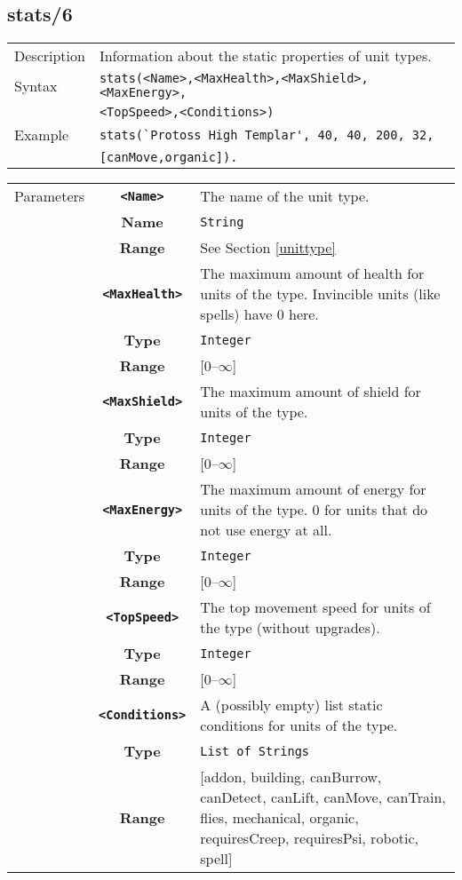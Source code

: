 \subsection{stats/6}
\begin{tabularx}{\textwidth}{lX}
 Description & Information about the static properties of unit types. \\
 Syntax & \verb|stats(<Name>,<MaxHealth>,<MaxShield>,<MaxEnergy>,| \\ & \quad \verb|<TopSpeed>,<Conditions>)| \\
 Example & \verb|stats(`Protoss High Templar', 40, 40, 200, 32,| \\ & \quad \verb|[canMove,organic]).| \\
 \end{tabularx}
 \begin{tabularx}{\textwidth}{l | c | p{8cm}|}
 \cline{2-3}
 Parameters & \textbf{\verb|<Name>|} & The name of the unit type. \\
            & \textbf{Name} & \verb|String| \\
            & \textbf{Range} & See Section \ref{unittype} \\
            \cline{2-3}
            & \textbf{\verb|<MaxHealth>|} & The maximum amount of health for units of the type. Invincible units (like spells) have 0 here. \\
            & \textbf{Type} & \verb|Integer| \\
            & \textbf{Range} & [0--$\infty$] \\
            \cline{2-3}
            & \textbf{\verb|<MaxShield>|} & The maximum amount of shield for units of the type. \\
            & \textbf{Type} & \verb|Integer| \\
            & \textbf{Range} & [0--$\infty$] \\
            \cline{2-3}
            & \textbf{\verb|<MaxEnergy>|} & The maximum amount of energy for units of the type. 0 for units that do not use energy at all. \\
            & \textbf{Type} & \verb|Integer| \\
            & \textbf{Range} & [0--$\infty$] \\
            \cline{2-3}
            & \textbf{\verb|<TopSpeed>|} & The top movement speed for units of the type (without upgrades).\\
            & \textbf{Type} & \verb|Integer| \\
            & \textbf{Range} & [0--$\infty$] \\
            \cline{2-3}
            & \textbf{\verb|<Conditions>|} & A (possibly empty) list static conditions for units of the type. \\
            & \textbf{Type} & \verb|List of Strings| \\
            & \textbf{Range} & [addon, building, canBurrow, canDetect, canLift, canMove, canTrain, flies, mechanical, organic, requiresCreep, requiresPsi, robotic, spell] \\
            \cline{2-3}
\end{tabularx}

